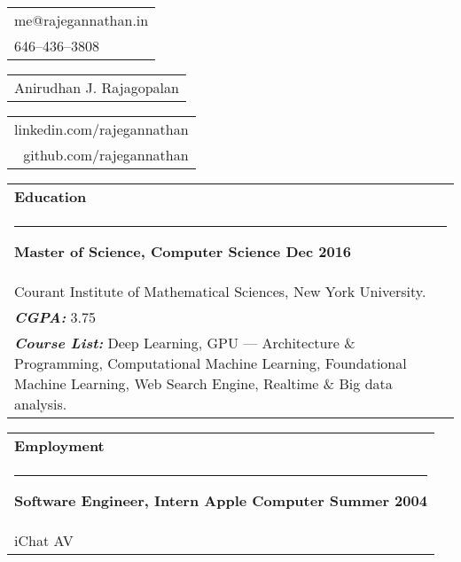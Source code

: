\documentclass{article}
\begin{document}
{\small\begin{tabular}[c]{l}
        me@rajegannathan.in \\
        646--436--3808
\end{tabular}}\hfill%
{\Large\bfseries\begin{tabular}[c]{c}
        Anirudhan J. Rajagopalan
\end{tabular}}\hfill%
{\small\begin{tabular}[c]{r}
        linkedin.com/rajegannathan \\
        github.com/rajegannathan
\end{tabular}}%


\bigskip

\begin{tabular}{p{\dimexpr\linewidth-2\tabcolsep}}
    \textbf{Education} \\
    \noindent\rule{\textwidth}{0.4pt}
    {\bfseries Master of Science, Computer Science \hfill Dec 2016} \\
    \quad Courant Institute of Mathematical Sciences, New York University.\\
    \quad \textbf{\textit{CGPA:}} 3.75 \\
    \quad \textbf{\textit{Course List:}} Deep Learning, GPU --- Architecture \& Programming, Computational Machine Learning, Foundational Machine Learning, Web Search Engine, Realtime \& Big data analysis.
\end{tabular}

\bigskip

\begin{tabular}{p{\dimexpr\linewidth-2\tabcolsep}}
    \textbf{Employment} \\
    \noindent\rule{\textwidth}{0.4pt}
    {\bfseries Software Engineer, Intern \qquad Apple Computer \hfill Summer 2004} \\
    \quad iChat AV
\end{tabular}
\end{document}

